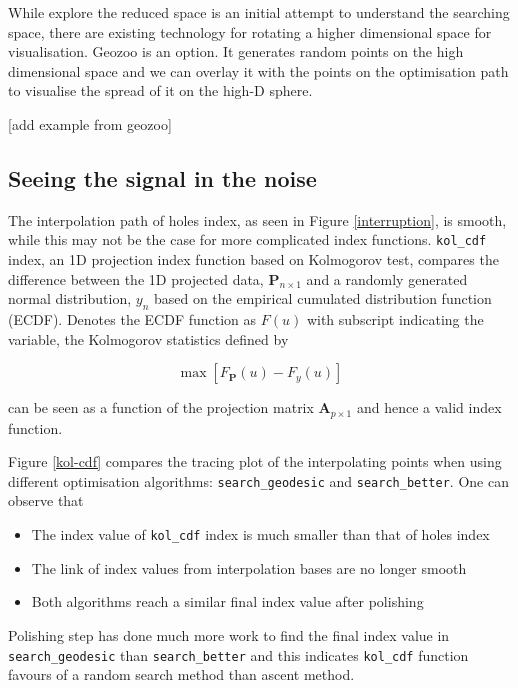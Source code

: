 \documentclass[12pt]{article}
\providecommand{\tightlist}{%
  \setlength{\itemsep}{0pt}\setlength{\parskip}{0pt}}
\begin{document}
While explore the reduced space is an initial attempt to understand the
searching space, there are existing technology for rotating a higher
dimensional space for visualisation. Geozoo is an option. It generates
random points on the high dimensional space and we can overlay it with
the points on the optimisation path to visualise the spread of it on the
high-D sphere.

{[}add example from geozoo{]}

\hypertarget{seeing-the-signal-in-the-noise}{%
\subsection{Seeing the signal in the
noise}\label{seeing-the-signal-in-the-noise}}

The interpolation path of holes index, as seen in Figure
\ref{interruption}, is smooth, while this may not be the case for more
complicated index functions. \texttt{kol\_cdf} index, an 1D projection
index function based on Kolmogorov test, compares the difference between
the 1D projected data, \(\mathbf{P}_{n \times 1}\) and a randomly
generated normal distribution, \(y_n\) based on the empirical cumulated
distribution function (ECDF). Denotes the ECDF function as \(F(u)\) with
subscript indicating the variable, the Kolmogorov statistics defined by

\[\max \left[F_{\mathbf{P}}(u) - F_{y}(u)\right]\]

can be seen as a function of the projection matrix
\(\mathbf{A}_{p \times 1}\) and hence a valid index function.

Figure \ref{kol-cdf} compares the tracing plot of the interpolating
points when using different optimisation algorithms:
\texttt{search\_geodesic} and \texttt{search\_better}. One can observe
that

\begin{itemize}
\tightlist
\item
  The index value of \texttt{kol\_cdf} index is much smaller than that
  of holes index
\item
  The link of index values from interpolation bases are no longer smooth
\item
  Both algorithms reach a similar final index value after polishing
\end{itemize}

Polishing step has done much more work to find the final index value in
\texttt{search\_geodesic} than \texttt{search\_better} and this
indicates \texttt{kol\_cdf} function favours of a random search method
than ascent method.
\end{document}

